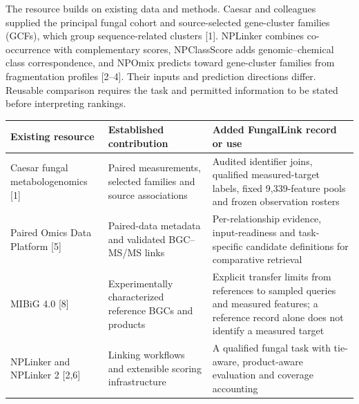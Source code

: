 \documentclass[
  10pt,
  a4paper,
]{article}
\newcounter{none} %
\begin{document}
The resource builds on existing data and methods. Caesar and colleagues supplied the principal fungal cohort and source-selected gene-cluster families (GCFs), which group sequence-related clusters {[}1{]}. NPLinker combines co-occurrence with complementary scores, NPClassScore adds genomic--chemical class correspondence, and NPOmix predicts toward gene-cluster families from fragmentation profiles {[}2--4{]}. Their inputs and prediction directions differ. Reusable comparison requires the task and permitted information to be stated before interpreting rankings.

{\def\LTcaptype{none} %
\begin{longtable}[]{@{}
  >{\raggedright\arraybackslash}p{}
  >{\raggedright\arraybackslash}p{}
  >{\raggedright\arraybackslash}p{}@{}}
\toprule\noalign{}
\begin{minipage}[b]{\linewidth}\raggedright
Existing resource
\end{minipage} & \begin{minipage}[b]{\linewidth}\raggedright
Established contribution
\end{minipage} & \begin{minipage}[b]{\linewidth}\raggedright
Added FungalLink record or use
\end{minipage} \\
\midrule\noalign{}
\endhead
\bottomrule\noalign{}
\endlastfoot
Caesar fungal metabologenomics {[}1{]} & Paired measurements, selected families and source associations & Audited identifier joins, qualified measured-target labels, fixed 9,339-feature pools and frozen observation rosters \\
Paired Omics Data Platform {[}5{]} & Paired-data metadata and validated BGC--MS/MS links & Per-relationship evidence, input-readiness and task-specific candidate definitions for comparative retrieval \\
MIBiG 4.0 {[}8{]} & Experimentally characterized reference BGCs and products & Explicit transfer limits from references to sampled queries and measured features; a reference record alone does not identify a measured target \\
NPLinker and NPLinker 2 {[}2,6{]} & Linking workflows and extensible scoring infrastructure & A qualified fungal task with tie-aware, product-aware evaluation and coverage accounting \\
\end{longtable}
}
\end{document}
